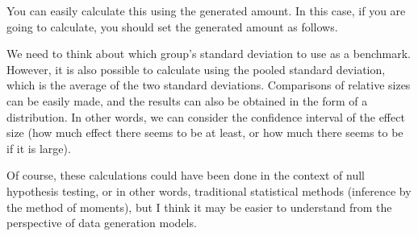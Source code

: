 \documentclass{ltjsbook}
\begin{document}
{%
You can easily calculate this using the generated amount. In this case, if you are going to calculate, you should set the generated amount as follows.


We need to think about which group's standard deviation to use as a benchmark. However, it is also possible to calculate using the pooled standard deviation, which is the average of the two standard deviations. Comparisons of relative sizes can be easily made, and the results can also be obtained in the form of a distribution. In other words, we can consider the confidence interval of the effect size (how much effect there seems to be at least, or how much there seems to be if it is large).

Of course, these calculations could have been done in the context of null hypothesis testing, or in other words, traditional statistical methods (inference by the method of moments), but I think it may be easier to understand from the perspective of data generation models.
}
\end{document}

